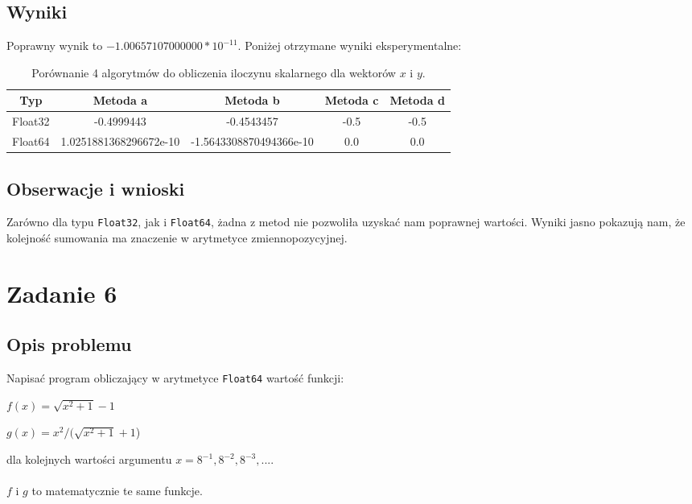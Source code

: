 \documentclass{article}
\begin{document}
\subsection{Wyniki}
Poprawny wynik to $-1.00657107000000 * 10^{-11}$. Poniżej otrzymane wyniki eksperymentalne:
\begin{table}[H]
\begin{adjustbox}{center}
\begin{tabular}{|c|c|c|c|c|}
    \hline
    Typ & Metoda a & Metoda b & Metoda c & Metoda d\\
    \hline
    Float32 & -0.4999443 & -0.4543457 & -0.5 & -0.5\\
    \hline
    Float64 & 1.0251881368296672e-10 & -1.5643308870494366e-10 & 0.0 & 0.0\\
    \hline
\end{tabular}
\end{adjustbox}
\caption{Porównanie 4 algorytmów do obliczenia iloczynu skalarnego dla wektorów $x$ i $y$.}
\end{table}

\subsection{Obserwacje i wnioski}
Zarówno dla typu \texttt{Float32}, jak i \texttt{Float64}, żadna z metod nie pozwoliła uzyskać nam poprawnej wartości.
Wyniki jasno pokazują nam, że kolejność sumowania ma znaczenie w arytmetyce zmiennopozycyjnej.

\section{Zadanie 6}
\subsection{Opis problemu}
Napisać program obliczający w arytmetyce \texttt{Float64} wartość funkcji:
\begin{description}
    \item $f(x) = \sqrt{x^2 + 1} - 1$
    \item $g(x) = x^2/(\sqrt{x^2 + 1} + 1$)
\end{description}
dla kolejnych wartości argumentu $x = 8^{-1}, 8^{-2}, 8^{-3}, ...$.
\\\\
$f$ i $g$ to matematycznie te same funkcje.
\end{document}
